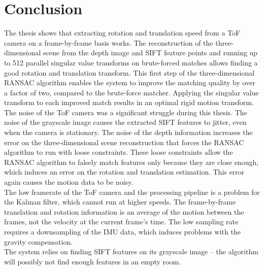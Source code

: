 \chapter{Conclusion}
\label{sec:Conclusion}
The thesis shows that extracting rotation and translation speed from a ToF camera on a frame-by-frame basis works. The reconstruction of the three-dimensional scene from the depth image and SIFT feature points and running up to 512 parallel singular value transforms on brute-forced matches allows finding a good rotation and translation transform. This first step of the three-dimensional RANSAC algorithm enables the system to improve the matching quality by over a factor of two, compared to the brute-force matcher. Applying the singular value transform to each improved match results in an optimal rigid motion transform.\\
The noise of the ToF camera was a significant struggle during this thesis. The noise of the grayscale image causes the extracted SIFT features to jitter, even when the camera is stationary. The noise of the depth information increases the error on the three-dimensional scene reconstruction that forces the RANSAC algorithm to run with loose constraints. These loose constraints allow the RANSAC algorithm to falsely match features only because they are close enough, which induces an error on the rotation and translation estimation. This error again causes the motion data to be noisy.\\
The low framerate of the ToF camera and the processing pipeline is a problem for the Kalman filter, which cannot run at higher speeds. The frame-by-frame translation and rotation information is an average of the motion between the frames, not the velocity at the current frame's time. The low sampling rate requires a downsampling of the IMU data, which induces problems with the gravity compensation.\\ 
The system relies on finding SIFT features on its grayscale image – the algorithm will possibly not find enough features in an empty room.


